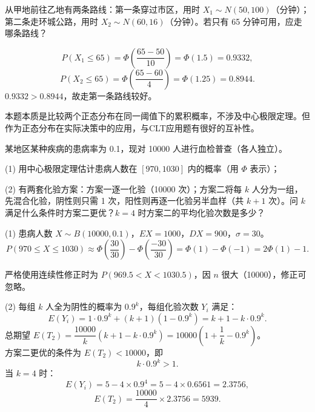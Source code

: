 \documentclass[lang=cn,11pt]{elegantbook}
\begin{document}
\begin{exercise}\label{exer:5-normal-route}
从甲地前往乙地有两条路线：第一条穿过市区，用时 \(X_1 \sim N(50, 100)\)（分钟）；第二条走环城公路，用时 \(X_2 \sim N(60, 16)\)（分钟）。若只有 65 分钟可用，应走哪条路线？
\end{exercise}
\begin{solution}
\[
P(X_1 \leq 65) = \Phi\!\left(\frac{65-50}{10}\right) = \Phi(1.5) = 0.9332,
\]
\[
P(X_2 \leq 65) = \Phi\!\left(\frac{65-60}{4}\right) = \Phi(1.25) = 0.8944.
\]
\(0.9332 > 0.8944\)，故走第一条路线较好。
\begin{note}
本题本质是比较两个正态分布在同一阈值下的累积概率，不涉及中心极限定理。但作为正态分布在实际决策中的应用，与CLT应用题有很好的互补性。
\end{note}
\end{solution}


\begin{exercise}\label{exer:5-clt-blood}
某地区某种疾病的患病率为 0.1，现对 10000 人进行血检普查（各人独立）。\par
(1) 用中心极限定理估计患病人数在 \([970, 1030]\) 内的概率（用 \(\Phi\) 表示）；\par
(2) 有两套化验方案：方案一逐一化验（10000 次）；方案二将每 \(k\) 人分为一组，先混合化验，阴性则只需 1 次，阳性则再逐一化验另半血样（共 \(k+1\) 次）。问 \(k\) 满足什么条件时方案二更优？\(k = 4\) 时方案二的平均化验次数是多少？
\end{exercise}
\begin{solution}
(1) 患病人数 \(X \sim B(10000, 0.1)\)，\(EX = 1000\)，\(DX = 900\)，\(\sigma = 30\)。
\[
P(970 \leq X \leq 1030) \approx \Phi\!\left(\frac{30}{30}\right) - \Phi\!\left(\frac{-30}{30}\right) = \Phi(1) - \Phi(-1) = 2\Phi(1) - 1.
\]
\begin{note}
严格使用连续性修正时为 \(P(969.5 < X < 1030.5)\)，因 \(n\) 很大（10000），修正可忽略。
\end{note}
(2) 每组 \(k\) 人全为阴性的概率为 \(0.9^k\)，每组化验次数 \(Y_i\) 满足：
\[
E(Y_i) = 1 \cdot 0.9^k + (k+1)(1-0.9^k) = k + 1 - k \cdot 0.9^k.
\]
总期望 \(E(T_2) = \dfrac{10000}{k}(k+1-k \cdot 0.9^k) = 10000\!\left(1 + \dfrac{1}{k} - 0.9^k\right)\)。\\
方案二更优的条件为 \(E(T_2) < 10000\)，即
\[
k \cdot 0.9^k > 1.
\]
当 \(k = 4\) 时：
\[
E(Y_i) = 5 - 4 \times 0.9^4 = 5 - 4 \times 0.6561 = 2.3756,
\]
\[
E(T_2) = \frac{10000}{4} \times 2.3756 = 5939.
\]
\end{solution}
\end{document}
